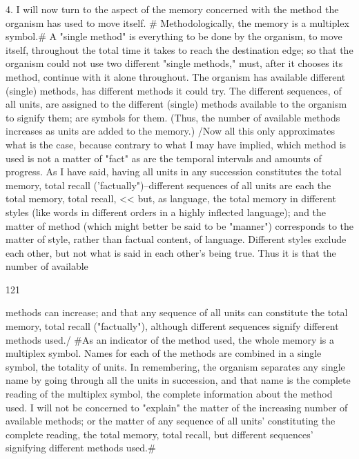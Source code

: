 \documentclass[10pt,twoside]{memoir}
\begin{document}
\begin{enumerate}
{\begin{enumerate}
\begin{sysrules}
\begin{sysrules}
\begin{sysrules}
\begin{sysrules}
{\begin{enumerate}
4. I will now turn to the aspect of the memory concerned with the 
method the organism has used to move itself. # Methodologically, the 
memory is a multiplex symbol.# A "single method" is everything to be done 
by the organism, to move itself, throughout the total time it takes to reach 
the destination edge; so that the organism could not use two different 
"single methods," must, after it chooses its method, continue with it alone 
throughout. The organism has available different (single) methods, has 
different methods it could try. The different sequences, of all units, are 
assigned to the different (single) methods available to the organism to signify 
them; are symbols for them. (Thus, the number of available methods 
increases as units are added to the memory.) /Now all this only approximates 
what is the case, because contrary to what I may have implied, which 
method is used is not a matter of "fact" as are the temporal intervals and 
amounts of progress. As I have said, having all units in any succession 
constitutes the total memory, total recall ('factually")--different sequences 
of all units are each the total memory, total recall, << but, as language, the 
total memory in different styles (like words in different orders in a highly 
inflected language); and the matter of method (which might better be said to 
be "manner") corresponds to the matter of style, rather than factual 
content, of language. Different styles exclude each other, but not what is 
said in each other's being true. Thus it is that the number of available 


121 


methods can increase; and that any sequence of all units can constitute the 
total memory, total recall ("factually"), although different sequences signify 
different methods used./ #As an indicator of the method used, the whole 
memory is a multiplex symbol. Names for each of the methods are combined 
in a single symbol, the totality of units. In remembering, the organism 
separates any single name by going through all the units in succession, and 
that name is the complete reading of the multiplex symbol, the complete 
information about the method used. I will not be concerned to "explain" 
the matter of the increasing number of available methods; or the matter of 
any sequence of all units' constituting the complete reading, the total 
memory, total recall, but different sequences' signifying different methods 
used.# 


\end{enumerate}}
\end{sysrules}
\end{sysrules}
\end{sysrules}
\end{sysrules}
\end{enumerate}}
\end{enumerate}
\end{document}
